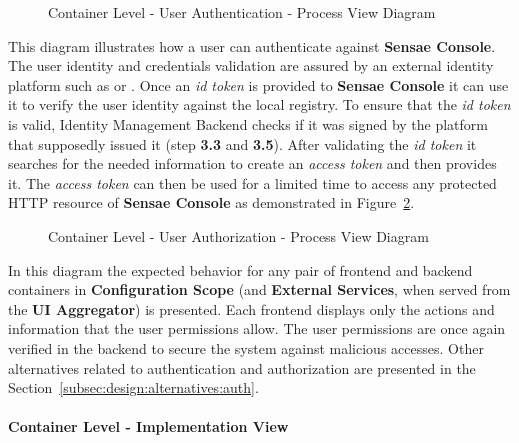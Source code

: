 \begin{figure}[H]
   \centering
   \resizebox{\columnwidth}{!}
   {
      
   }
   \caption[Container Level - User Authentication - Process View Diagram]{Container Level - User Authentication - Process View Diagram}
   \label{fig:design:architecture:platform:container:process:diagram:authentication}
\end{figure}

This diagram illustrates how a user can authenticate against \textbf{Sensae Console}.
The user identity and credentials validation are assured by an external identity platform such as  or . Once an \textit{id token} is provided to \textbf{Sensae Console} it can use it to verify the user identity against the local registry. To ensure that the \textit{id token} is valid, Identity Management Backend checks if it was signed by the platform that supposedly issued it (step \textbf{3.3} and \textbf{3.5}). After validating the \textit{id token} it searches for the needed information to create an \textit{access token} and then provides it. The \textit{access token} can then be used for a limited time to access any protected HTTP resource of \textbf{Sensae Console} as demonstrated in Figure~\ref{fig:design:architecture:platform:container:process:diagram:authorization}.

\begin{figure}[H]
   \centering
   \resizebox{0.8\columnwidth}{!}
   {
      
   }
   \caption[Container Level - User Authorization - Process View Diagram]{Container Level - User Authorization - Process View Diagram}
   \label{fig:design:architecture:platform:container:process:diagram:authorization}
\end{figure}

In this diagram the expected behavior for any pair of frontend and backend containers in \textbf{Configuration Scope} (and \textbf{External Services}, when served from the \textbf{UI Aggregator}) is presented. Each frontend displays only the actions and information that the user permissions allow. The user permissions are once again verified in the backend to secure the system against malicious accesses. Other alternatives related to authentication and authorization are presented in the Section~\ref{subsec:design:alternatives:auth}.

\paragraph{Container Level - Implementation View}
\label{par:design:architecture:platform:container:development}

